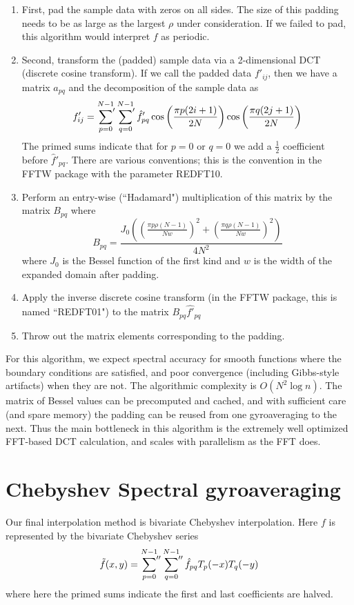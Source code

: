 \begin{enumerate}
	\item First, pad the sample data with zeros on all sides.  The size of this padding needs to be as large as the largest $\rho$ under consideration.  If we failed to pad, this algorithm would interpret $f$ as periodic.
	\item Second, transform the (padded) sample data via a 2-dimensional DCT (discrete cosine transform).  If we call the padded data $f'_{ij}$, then we have a matrix $a_{pq}$ and the decomposition of the sample data as
	\[  f'_{ij} = \sideset{}{'}\sum_{p=0}^{N-1} \sideset{}{'}\sum_{q=0}^{N-1} \hat{f}'_{pq} \cos \left( \frac{\pi p (2i+1)}{2N} \right)  \cos \left( \frac{\pi q (2j+1)}{2N} \right) \]
	The primed sums indicate that for $p=0$ or $q=0$ we add a $\frac{1}{2}$ coefficient before $\hat{f}'_{pq}$.  There are various conventions; this is the convention in the FFTW package with the parameter REDFT10.  
	\item Perform an entry-wise (``Hadamard")  multiplication of this matrix by the matrix $B_{pq}$ where
	\[ B_{pq} = \frac{J_0\left(  \left( \frac{\pi p \rho (N-1)}{Nw}  \right)^2  +  \left( \frac{\pi q \rho (N-1)}{Nw}  \right)^2   \right)}{4N^2} \]
	where $J_0$ is the Bessel function of the first kind and $w$ is the width of the expanded domain after padding.
	\item Apply the inverse discrete cosine transform (in the FFTW package, this is named ``REDFT01") to the matrix $B_{pq}\hat{f'}_{pq}$
	\item Throw out the matrix elements corresponding to the padding.
\end{enumerate}
For this algorithm, we expect spectral accuracy for smooth functions where the boundary conditions are satisfied, and poor convergence (including Gibbs-style artifacts) when they are not.  The algorithmic complexity is $O(N^2 \log n)$.  The matrix of Bessel values can be precomputed and cached, and with sufficient care (and spare memory) the padding can be reused from one gyroaveraging to the next.  Thus the main bottleneck in this algorithm is the extremely well optimized FFT-based DCT calculation, and scales with parallelism as the FFT does.

\section{Chebyshev Spectral gyroaveraging}
Our final interpolation method is bivariate Chebyshev interpolation.  Here $f$ is represented by the bivariate Chebyshev series
\[  \tilde{f}(x,y) = \sideset{}{''}\sum_{p=0}^{N-1} \sideset{}{''}\sum_{q=0}^{N-1} \hat{f}_{pq}  T_p(-x) T_q(-y) \]
where here the primed sums indicate the first and last coefficients are halved.  \\

